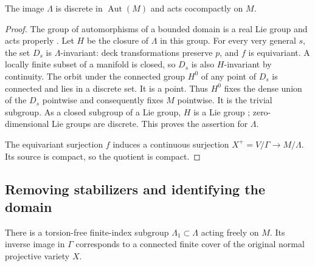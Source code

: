 \begin{proposition}\label{prop:grp-discrete}
The image $\Lambda$ is discrete in $\operatorname{Aut}(M)$ and acts cocompactly on $M$.
\end{proposition}

\begin{proof}
The group of automorphisms of a bounded domain is a real Lie group \cite[Proposition~3.1 and Theorem~6.2]{Kobayashi1967} and acts properly \cite[\S2, Propositions~2--3]{BlanchardCartan1954}.  Let $H$ be the closure of $\Lambda$ in this group. For every very general $s$, the set $D_s$ is $\Lambda$-invariant: deck transformations preserve $p$, and $f$ is equivariant.  A locally finite subset of a manifold is closed, so $D_s$ is also $H$-invariant by continuity.  The orbit under the connected group $H^0$ of any point of $D_s$ is connected and lies in a discrete set.  It is a point. Thus $H^0$ fixes the dense union of the $D_s$ pointwise and consequently fixes $M$ pointwise.  It is the trivial subgroup.  As a closed subgroup of a Lie group, $H$ is a Lie group \cite[Chapter~II, \S III, no.~27]{CartanLie1952}; zero-dimensional Lie groups are discrete.  This proves the assertion for $\Lambda$.

The equivariant surjection $f$ induces a continuous surjection $X^+=V/\Gamma\to M/\Lambda$.  Its source is compact, so the quotient is compact.
\end{proof}

\subsection{Removing stabilizers and identifying the domain}

\begin{lemma}\label{lem:grp-free-finite-index}
There is a torsion-free finite-index subgroup $\Lambda_1\subset\Lambda$ acting freely on $M$.  Its inverse image in $\Gamma$ corresponds to a connected finite cover of the original normal projective variety $X$.
\end{lemma}

